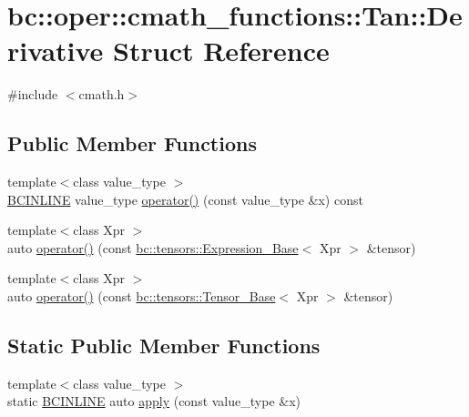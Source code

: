 \hypertarget{structbc_1_1oper_1_1cmath__functions_1_1Tan_1_1Derivative}{}\section{bc\+:\+:oper\+:\+:cmath\+\_\+functions\+:\+:Tan\+:\+:Derivative Struct Reference}
\label{structbc_1_1oper_1_1cmath__functions_1_1Tan_1_1Derivative}


{\ttfamily \#include $<$cmath.\+h$>$}

\subsection*{Public Member Functions}
\begin{DoxyCompactItemize}
\item 
{\footnotesize template$<$class value\+\_\+type $>$ }\\\hyperlink{common_8h_a6699e8b0449da5c0fafb878e59c1d4b1}{B\+C\+I\+N\+L\+I\+NE} value\+\_\+type \hyperlink{structbc_1_1oper_1_1cmath__functions_1_1Tan_1_1Derivative_a8e76b3dfad2198162015ef6fce1f45ba}{operator()} (const value\+\_\+type \&x) const
\item 
{\footnotesize template$<$class Xpr $>$ }\\auto \hyperlink{structbc_1_1oper_1_1cmath__functions_1_1Tan_1_1Derivative_a478c88100e74977f873306bbe1271908}{operator()} (const \hyperlink{classbc_1_1tensors_1_1Expression__Base}{bc\+::tensors\+::\+Expression\+\_\+\+Base}$<$ Xpr $>$ \&tensor)
\item 
{\footnotesize template$<$class Xpr $>$ }\\auto \hyperlink{structbc_1_1oper_1_1cmath__functions_1_1Tan_1_1Derivative_a0bab0c1cfe691bc96287224fb2305edf}{operator()} (const \hyperlink{classbc_1_1tensors_1_1Tensor__Base}{bc\+::tensors\+::\+Tensor\+\_\+\+Base}$<$ Xpr $>$ \&tensor)
\end{DoxyCompactItemize}
\subsection*{Static Public Member Functions}
\begin{DoxyCompactItemize}
\item 
{\footnotesize template$<$class value\+\_\+type $>$ }\\static \hyperlink{common_8h_a6699e8b0449da5c0fafb878e59c1d4b1}{B\+C\+I\+N\+L\+I\+NE} auto \hyperlink{structbc_1_1oper_1_1cmath__functions_1_1Tan_1_1Derivative_a8f71ba1cfb93556643b85d459be00fc1}{apply} (const value\+\_\+type \&x)
\end{DoxyCompactItemize}


